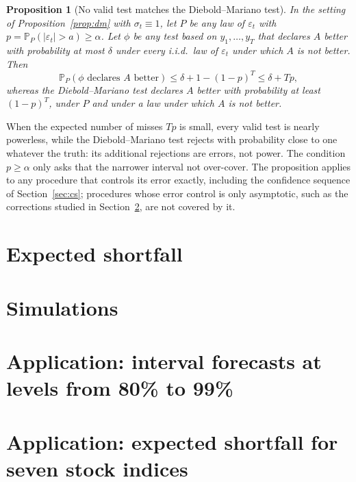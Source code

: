 \documentclass[11pt]{article}
\newtheorem{proposition}{Proposition}
\theoremstyle{remark}
\theoremstyle{definition}
\renewcommand{\Pr}{\mathbb{P}}
\begin{document}
\begin{proposition}[No valid test matches the Diebold--Mariano test]
\label{prop:dm-valid}
In the setting of Proposition~\ref{prop:dm} with $\sigma_t\equiv1$, let
$P$ be any law of $\varepsilon_t$ with $p=\Pr_P(|\varepsilon_t|>a)\ge\alpha$.
Let $\phi$ be any test based on $y_1,\ldots,y_T$ that declares $A$ better
with probability at most $\delta$ under every i.i.d.\ law of
$\varepsilon_t$ under which $A$ is not better. Then
\[
 \Pr_P(\phi\text{ declares }A\text{ better})\le\delta+1-(1-p)^T\le\delta+Tp,
\]
whereas the Diebold--Mariano test declares $A$ better with probability at
least $(1-p)^T$, under $P$ and under a law under which $A$ is not better.
\end{proposition}

When the expected number of misses $Tp$ is small, every valid test is
nearly powerless, while the Diebold--Mariano test rejects with probability
close to one whatever the truth: its additional rejections are errors, not
power. The condition $p\ge\alpha$ only asks that the narrower interval not
over-cover. The proposition applies to any procedure that controls its
error exactly, including the confidence sequence of Section~\ref{sec:cs};
procedures whose error control is only asymptotic, such as the
corrections studied in Section~\ref{sec:sim}, are not covered by it.

\section{Expected shortfall}
\label{sec:es}



\section{Simulations}
\label{sec:sim}



\section{Application: interval forecasts at levels from 80\% to 99\%}
\label{sec:empirical}



\section{Application: expected shortfall for seven stock indices}
\label{sec:es-empirical}
\end{document}
